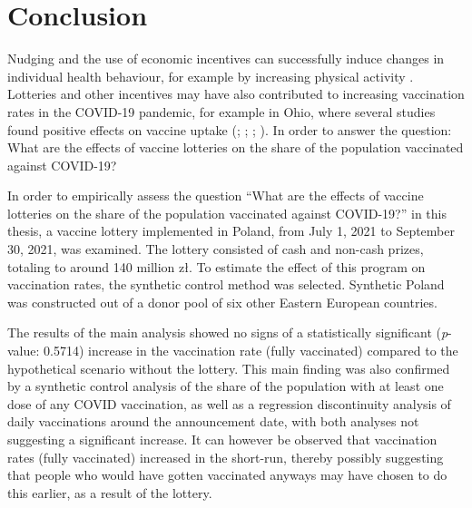 \documentclass{scrbook}
\begin{document}
\chapter{Conclusion}

Nudging and the use of economic incentives can successfully induce
changes in individual health behaviour, for example by increasing
physical activity \parencite{ciccone_using_2021}. Lotteries and other
incentives may have also contributed to increasing vaccination rates in
the COVID-19 pandemic, for example in Ohio, where several studies found
positive effects on vaccine uptake (\cite{mallow_covid-19_2022};
\cite{brehm_ohio_2022}; \cite{barber_conditional_2022};
\cite{sehgal_impact_2021}). In order to answer the question: What are
the effects of vaccine lotteries on the share of the population
vaccinated against COVID-19?

In order to empirically assess the question ``What are the effects of
vaccine lotteries on the share of the population vaccinated against
COVID-19?'' in this thesis, a vaccine lottery implemented in Poland,
from July 1, 2021 to September 30, 2021, was examined. The lottery
consisted of cash and non-cash prizes, totaling to around 140 million
zł. To estimate the effect of this program on vaccination rates, the
synthetic control method was selected. Synthetic Poland was constructed
out of a donor pool of six other Eastern European countries.

The results of the main analysis showed no signs of a statistically
significant (\textit{p}-value: 0.5714) increase in the vaccination rate
(fully vaccinated) compared to the hypothetical scenario without the
lottery. This main finding was also confirmed by a synthetic control
analysis of the share of the population with at least one dose of any
COVID vaccination, as well as a regression discontinuity analysis of
daily vaccinations around the announcement date, with both analyses not
suggesting a significant increase. It can however be observed that
vaccination rates (fully vaccinated) increased in the short-run, thereby
possibly suggesting that people who would have gotten vaccinated anyways
may have chosen to do this earlier, as a result of the lottery.
\end{document}
